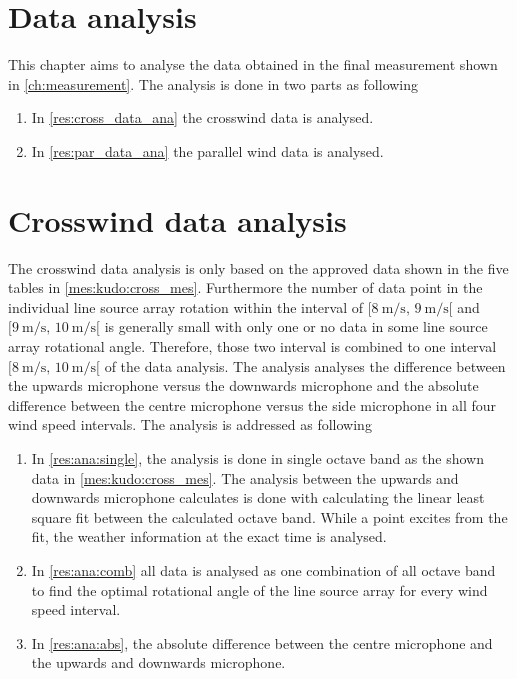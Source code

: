 \section{Data analysis}
This chapter aims to analyse the data obtained in the final measurement shown in \autoref{ch:measurement}. The analysis is done in two parts as following 

\begin{enumerate}
\item In \autoref{res:cross_data_ana} the crosswind data is analysed.
\item In \autoref{res:par_data_ana} the parallel wind data is analysed.
\end{enumerate}





\section{Crosswind data analysis}\label{res:cross_data_ana}
The crosswind data analysis is only based on the approved data shown in the five tables in \autoref{mes:kudo:cross_mes}. Furthermore the number of data point in the individual line source array rotation within the interval of $[\SI{8}{\meter\per\second},\, \SI{9}{\meter\per\second}[ $ and $[\SI{9}{\meter\per\second},\, \SI{10}{\meter\per\second}[ $ is generally small with only one or no data in some line source array rotational angle. Therefore, those two interval is combined to one interval $[\SI{8}{\meter\per\second},\, \SI{10}{\meter\per\second}[ $ of the data analysis. The analysis analyses the difference between the upwards microphone versus the downwards microphone and the absolute difference between the centre microphone versus the side microphone in all four wind speed intervals. The analysis is addressed as following  

\begin{enumerate}
\item  In \autoref{res:ana:single}, the analysis is done in single octave band as the shown data in \autoref{mes:kudo:cross_mes}. The analysis between the upwards and downwards microphone calculates is done with calculating the linear least square fit between the calculated octave band. While a point excites  from the fit, the weather information at the exact time is analysed.
\item In \autoref{res:ana:comb} all data is analysed as one combination of all octave band to find the optimal rotational angle of the line source array for every wind speed interval. 
\item In \autoref{res:ana:abs}, the absolute difference between the centre microphone and the upwards and downwards microphone. 
\end{enumerate}

